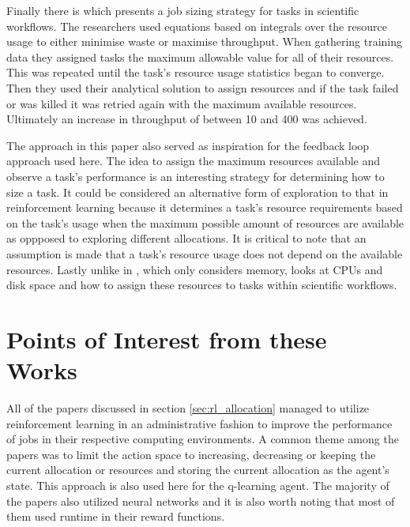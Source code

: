 Finally there is \cite{tovarjob} which presents a job sizing strategy for tasks in scientific workflows. The researchers used equations based on integrals over the resource usage to either minimise waste or maximise throughput. When gathering training data they assigned tasks the maximum allowable value for all of their resources. This was repeated until the task’s resource usage statistics began to converge. Then they used their analytical solution to assign resources and if the task failed or was killed it was retried again with the maximum available resources. Ultimately an increase in throughput of between 10 and 400 was achieved.

The approach in this paper also served as inspiration for the feedback loop approach used here. The idea to assign the maximum resources available and observe a task’s performance is an interesting strategy for determining how to size a task. It could be considered an alternative form of exploration to that in reinforcement learning because it determines a task's resource requirements based on the task's usage when the maximum possible amount of resources are available as oppposed to exploring different allocations. It is critical to note that an assumption is made that a task’s resource usage does not depend on the available resources. Lastly unlike in \cite{FeedbackBasedAllocation}, which only considers memory, \cite{tovarjob} looks at CPUs and disk space and how to assign these resources to tasks within scientific workflows.

\section{Points of Interest from these Works}
\label{sec:takeaways}

All of the papers discussed in section \ref{sec:rl_allocation} managed to utilize reinforcement learning in an administrative fashion to improve the performance of jobs in their respective computing environments. A common theme among the papers was to limit the action space to increasing, decreasing or keeping the current allocation or resources and storing the current allocation as the agent’s state. This approach is also used here for the q-learning agent. The majority of the papers also utilized neural networks and it is also worth noting that most of them used runtime in their reward functions. 

